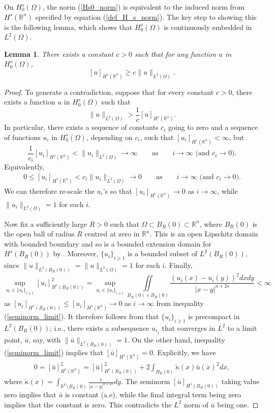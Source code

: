 \documentclass[preprint,12pt]{elsarticle}
\newcommand{\R}{\mathbb R}
\newtheorem{lemma}[theorem]{Lemma}
\begin{document}
On $H^s_0(\Omega)$, the norm (\ref{Hs0_norm}) is equivalent to the induced norm from $H^s(\R^n)$ specified by equation (\ref{def_H_s_norm}). The key step to showing this is the following lemma, which shows that $H^s_0(\Omega)$ is continuously embedded in $L^2(\Omega)$.

\begin{lemma}\label{lem_equiv_norms} 
    There exists a constant $c>0$ such that for any function $u$ in $H^s_0(\Omega)$,
    \[
        [u]_{H^s(\R^n)}\geq c\|u\|_{L^2(\Omega)}.
    \] 
\end{lemma}
\begin{proof} To generate a contradiction, suppose that for every constant $c>0$, there exists a function $u$ in $H^s_0(\Omega)$ such that 
\[
\|u\|_{L^2(\Omega)}>\frac{1}{c}[u]_{H^s(\R^n)}.
\]
In particular, there exists a sequence of constants $c_i$ going to zero and a sequence of functions $u_i$ in $H^s_0(\Omega)$, depending on $c_i$, such that $[u_i]_{H^s(\R^n)}<\infty$, but 
\[
\frac{1}{c_i}[u_i]_{H^s(\R^n)}<\|u_i\|_{L^2(\Omega)}\to\infty \qquad\mbox{as}\qquad i\to\infty\mbox{ (and }c_i\to 0).
\]
Equivalently,
\begin{align}\label{seminorm_limit}
        0\leq [u_i]_{H^s(\R^n)}<c_i\|u_i\|_{L^2(\Omega)}\to 0\qquad\mbox{as}\qquad i\to\infty\mbox{ (and }c_i\to 0).
\end{align}
We can therefore re-scale the $u_i$'s so that $[u_i]_{H^s(\R^n)}\to 0$ as $i\to\infty$, while $\|u_i\|_{L^2(\Omega)}=1$ for each $i$.

Now fix a sufficiently large $R>0$ such that $\Omega\subset B_R(0)\subset\R^n$, where $B_R(0)$ is the open ball of radius $R$ centred at zero in $\R^n$. This is an open Lipschitz domain with bounded boundary and so is a bounded extension domain for $H^s(B_R(0))$ by \cite[p. 33]{NPV}. Moreover, $\{u_i\}_{i\geq 1}$ is a bounded subset of $L^2(B_R(0))$, since $\|u\|_{L^2(B_R(0))}=\|u\|_{L^2(\Omega)}=1$ for each $i$. Finally,
\[
\sup_{u_i\in\{u_i\}_{i\geq 1}}[u_i]^2_{H^s(B_R(0))}=\sup_{u_i\in\{u_i\}_{i\geq 1}}\iint\limits_{B_R(0)\times B_R(0)}\frac{(u_i(x)-u_i(y))^2dxdy}{|x-y|^{n+2s}}<\infty
\]
as $[u_i]_{H^s(B_R(0))}\leq [u_i]_{H^s(\R^n)}\to 0$ as $i\to\infty$ from inequality (\ref{seminorm_limit}). It therefore follows from \cite[Th. 7.1]{NPV} that $\{u_i\}_{i\geq 1}$ is precompact in $L^2(B_R(0))$; i.e., there exists a subsequence $u_{i_j}$ that converges in $L^2$ to a limit point, $\bar{u}$, say, with $\|\bar{u}\|_{L^2(B_R(0))}=1$. On the other hand, inequality (\ref{seminorm_limit}) implies that $[\bar{u}]_{H^s(\R^n)}=0$. Explicitly, we have
\begin{align*}
    0=[\bar{u}]^2_{H^s(\R^n)}=[\bar{u}]^2_{H^s(B_R(0))}+2\int_{B_R(0)}\tilde{\kappa}(x)\bar{u}(x)^2dx,
\end{align*}
where $\tilde{\kappa}(x)=\int_{\R^n\setminus B_R(0)}\frac{1}{|x-y|^{n+2s}}dy$. The seminorm $[\bar{u}]_{H^s(B_R(0))}$ taking value zero implies that $\bar{u}$ is constant (a.e), while the final integral term being zero implies that the constant is zero. This contradicts the $L^2$ norm of $\bar{u}$ being one.
\end{proof}
\end{document}
